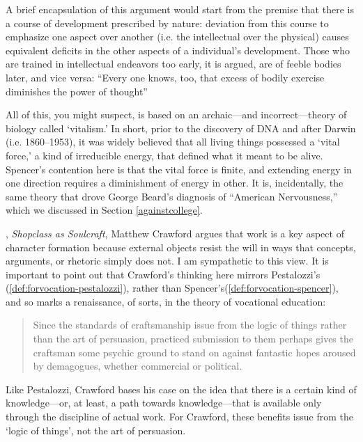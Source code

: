 A brief encapsulation of this argument would start from the premise that there is a course of development prescribed by nature: deviation from this course to emphasize one aspect over another (i.e. the intellectual over the physical) causes equivalent deficits in the other aspects of a individual's development. Those who are trained in intellectual endeavors too early, it is argued, are of feeble bodies later, and vice versa: ``Every one knows, too, that excess of bodily exercise diminishes the power of thought'' ~\citep[p. 285]{Spencer:1861ts}

All of this, you might suspect, is based on an archaic---and incorrect---theory of biology called `vitalism.' In short, prior to the discovery of DNA and after Darwin (i.e. 1860--1953), it was widely believed that all living things possessed a `vital force,' a kind of irreducible energy, that defined what it meant to be alive. Spencer's contention here is that the vital force is finite, and extending energy in one direction requires a diminishment of energy in other. It is, incidentally, the same theory that drove George Beard's diagnosis of ``American Nervousness,'' which we discussed in Section \ref{againstcollege}.

, \emph{Shopclass as Soulcraft}, Matthew Crawford argues that work is a key aspect of character formation because external objects resist the will in ways that concepts, arguments, or rhetoric simply does not. I am sympathetic to this view. It is important to point out that Crawford's thinking here mirrors Pestalozzi's (\ref{def:forvocation-pestalozzi}), rather than Spencer's(\ref{def:forvocation-spencer}), and so marks a renaissance, of sorts, in the theory of vocational education:

\begin{quote}

Since the standards of craftsmanship issue from the logic of things rather than the art of persuasion, practiced submission to them perhaps gives the craftsman some psychic ground to stand on against fantastic hopes aroused by demagogues, whether commercial or political. ~\citep[p. 18]{Crawford:2009tz}
\end{quote}

Like Pestalozzi, Crawford bases his case on the idea that there is a certain kind of knowledge---or, at least, a path towards knowledge---that is available only through the discipline of actual work. For Crawford, these benefits issue from the `logic of things', not the art of persuasion.

